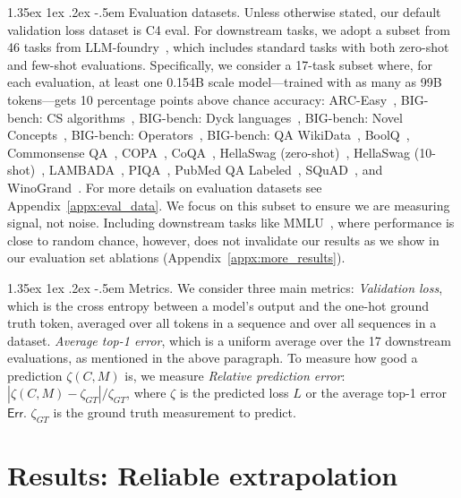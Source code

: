 \documentclass[dvipsnames,11pt]{article}
\makeatletter
\renewcommand\paragraph{\@startsection{paragraph}{4}{\z@}                                     {1.35ex \@plus1ex \@minus.2ex}                                {-.5em}
{\normalfont\normalsize\bfseries}}
\makeatother
\begin{document}
\paragraph{Evaluation datasets.}
Unless otherwise stated, our default validation loss dataset is C4 eval.
For downstream tasks, we adopt a subset from 46 tasks from LLM-foundry~\cite{mosaicml}, which includes standard tasks with both zero-shot and few-shot evaluations.
Specifically, we consider a 17-task subset where, for each evaluation, at least one 0.154B scale model---trained with as many as 99B tokens---gets 10 percentage points above chance accuracy:
ARC-Easy~\cite{arc},
BIG-bench: CS algorithms~\cite{srivastava2023beyond},
BIG-bench: Dyck languages~\cite{srivastava2023beyond},
BIG-bench: Novel Concepts~\cite{srivastava2023beyond},
BIG-bench: Operators~\cite{srivastava2023beyond},
BIG-bench: QA WikiData~\cite{srivastava2023beyond},
BoolQ~\cite{boolq},
Commonsense QA~\cite{talmor-etal-2019-commonsenseqa},
COPA~\cite{copa},
CoQA~\cite{reddy-etal-2019-coqa},
HellaSwag (zero-shot)~\cite{hellaswag},
HellaSwag (10-shot)~\cite{hellaswag},
LAMBADA~\cite{lambada},
PIQA~\cite{piqa},
PubMed QA Labeled~\cite{pubmed},
SQuAD~\cite{squad},
and
WinoGrand~\cite{winograd}.
For more details on evaluation datasets see Appendix~\ref{appx:eval_data}.
We focus on this subset to ensure we are measuring signal, not noise.
Including downstream tasks like MMLU~\cite{mmlu}, where performance is close to random chance, however, does not invalidate our results as we show in our evaluation set ablations (Appendix~\ref{appx:more_results}).

\paragraph{Metrics.}
We consider three main metrics:
\emph{Validation loss}, which is the cross entropy between a model's output and the one-hot ground truth token, averaged over all tokens in a sequence and over all sequences in a dataset.
\emph{Average top-1 error}, which is a uniform average over the 17 downstream evaluations, as mentioned in the above paragraph.
To measure how good a prediction $\zeta(C, M)$ is, we measure \emph{Relative prediction error}: $|\zeta(C, M) - \zeta_{GT}| / \zeta_{GT}$, where $\zeta$ is the predicted loss $L$ or the average top-1 error $\textsf{Err}$. $\zeta_{GT}$ is the ground truth measurement to predict.

\section{Results: Reliable extrapolation}
\label{sec:results}
\end{document}
